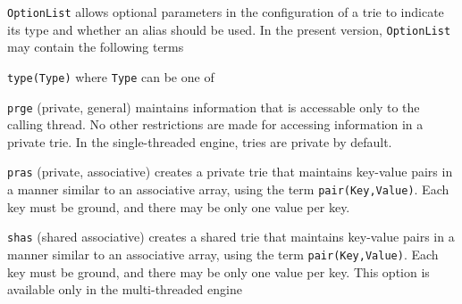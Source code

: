 \begin{description}
%
%
{\tt OptionList} allows optional parameters in the configuration of a
trie to indicate its type and whether an alias should be used.  In the
present version, {\tt OptionList} may contain the following terms
\bi
\item {\tt type(Type)} where {\tt Type} can be one of
\bi
\item {\tt prge} (private, general) maintains information that is
  accessable only to the calling thread.  No other restrictions are
  made for accessing information in a private trie.  In the
  single-threaded engine, tries are private by default.

\item {\tt pras} (private, associative) creates a private trie that
  maintains key-value pairs in a manner similar to an associative
  array, using the term {\tt pair(Key,Value)}.  Each key must be ground,
  and there may be only one value per key.

\item {\tt shas} (shared associative) creates a shared trie that
  maintains key-value pairs in a manner similar to an associative
  array, using the term {\tt pair(Key,Value)}.  Each key must be
  ground, and there may be only one value per key.  This option is
  available only in the multi-threaded engine


\end{description}
